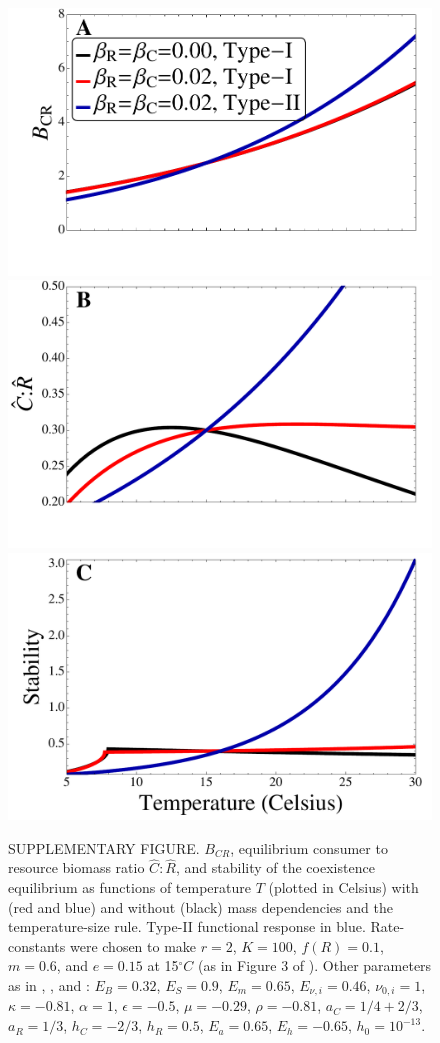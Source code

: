 \documentclass[11pt]{article}
\begin{document}
\begin{figure}[!ht]
\centering
\includegraphics[width=0.5\linewidth]{BCRTypeII}\\\vspace{-0.75cm}
\includegraphics[width=0.5\linewidth]{CtoRTypeII}\\\vspace{-0.75cm}
\includegraphics[width=0.5\linewidth]{StabilityTypeII}
\caption{
SUPPLEMENTARY FIGURE.
$B_{CR}$, equilibrium consumer to resource biomass ratio $\hat{C}:\hat{R}$, and stability of the coexistence equilibrium as functions of temperature $T$ (plotted in Celsius) with (red and blue) and without (black) mass dependencies and the temperature-size rule.
Type-II functional response in blue.
Rate-constants were chosen to make $r = 2$, $K = 100$, $f(R) = 0.1$, $m = 0.6$, and $e = 0.15$ at 15$^\circ C$ (as in Figure 3 of \cite{Gilbert2014}).
Other parameters as in \cite{Gilbert2014}, \cite{DeLong2015}, and \cite{Rall2012}: $E_B = 0.32$, $E_S = 0.9$, $E_m = 0.65$, $E_{\nu,i} = 0.46$, $\nu_{0,i} = 1$, $\kappa = -0.81$, $\alpha = 1$, $\epsilon = -0.5$, $\mu = -0.29$, $\rho = -0.81$, $a_C = 1/4+2/3$, $a_R = 1/3$, $h_C = -2/3$, $h_R = 0.5$, $E_a = 0.65$, $E_h = -0.65$, $h_0 = 10^{-13}$.  
}
\label{TypeII}
\end{figure}
\end{document}
